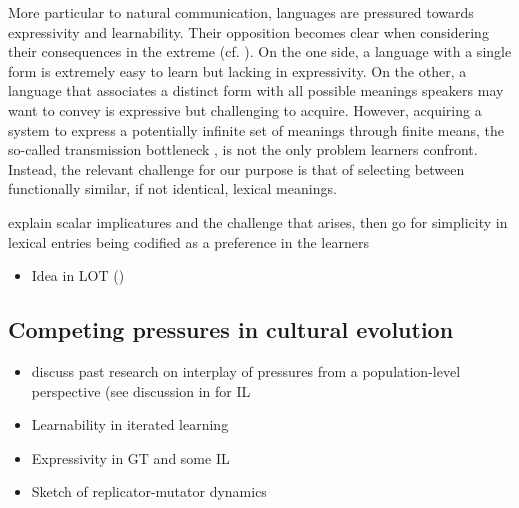 \documentclass[a4paper]{article}
\newcommand{\citeposs}[2][]{\citeauthor{#2}'s (\citeyear[#1]{#2})}
\newcommand{\hl}[1]{\textcolor[rgb]{.8,.33,.0}{#1}}%
\begin{document}
More particular to natural communication, languages are pressured towards expressivity and learnability. Their opposition becomes clear when considering their consequences in the extreme (cf. \citealt{kemp+regier:2012,kirby+etal:2015}). On the one side, a language with a single form is extremely easy to learn but lacking in expressivity. On the other, a language that associates a distinct form with all possible meanings speakers may want to convey is expressive but challenging to acquire. However, acquiring a system to express a potentially infinite set of meanings through finite means, the so-called transmission bottleneck \citep{kirby:2002}, is not the only problem learners confront. Instead, the relevant challenge for our purpose is that of selecting between functionally similar, if not identical, lexical meanings. 


\hl{explain scalar implicatures and the challenge that arises, then go for simplicity in lexical entries being codified as a preference in the learners}



\begin{itemize}
  \item \hl{Idea in LOT (\citealt{piantadosi+etal:underreview})}
\end{itemize}

\subsection{Competing pressures in cultural evolution}
\begin{itemize}
  \item \hl{discuss past research on interplay of pressures from a population-level perspective (see discussion in \citealt{kirby+etal:2015} for IL}
  \item \hl{Learnability in iterated learning}
  \item \hl{Expressivity in GT and some IL}
  \item \hl{Sketch of replicator-mutator dynamics}
\end{itemize}
\end{document}
